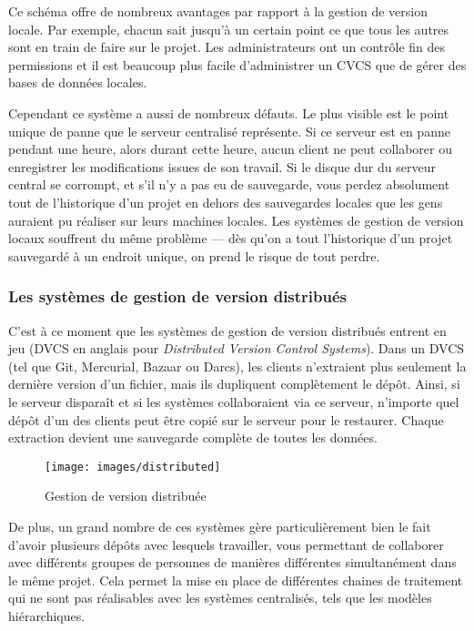 Ce schéma offre de nombreux avantages par rapport à la gestion de version locale.
Par exemple, chacun sait jusqu'à un certain point ce que tous les autres sont en train de faire sur le projet.
Les administrateurs ont un contrôle fin des permissions et il est beaucoup plus facile d'administrer un CVCS que de gérer des bases de données locales.

Cependant ce système a aussi de nombreux défauts.
Le plus visible est le point unique de panne que le serveur centralisé représente.
Si ce serveur est en panne pendant une heure, alors durant cette heure, aucun client ne peut collaborer ou enregistrer les modifications issues de son travail.
Si le disque dur du serveur central se corrompt, et s'il n'y a pas eu de sauvegarde, vous perdez absolument tout de l'historique d'un projet en dehors des sauvegardes locales que les gens auraient pu réaliser sur leurs machines locales.
Les systèmes de gestion de version locaux souffrent du même problème  --- dès qu'on a tout l'historique d'un projet sauvegardé à un endroit unique, on prend le risque de tout perdre.

\subsubsection{Les systèmes de gestion de version distribués}

C'est à ce moment que les systèmes de gestion de version distribués entrent en jeu (DVCS en anglais pour \emph{Distributed Version Control Systems}).
Dans un DVCS (tel que Git, Mercurial, Bazaar ou Darcs), les clients n'extraient plus seulement la dernière version d'un fichier, mais ils dupliquent complètement le dépôt.
Ainsi, si le serveur disparaît et si les systèmes collaboraient via ce serveur, n'importe quel dépôt d'un des clients peut être copié sur le serveur pour le restaurer.
Chaque extraction devient une sauvegarde complète de toutes les données.

\begin{figure}[H]
  \centering
  \texttt{[image: images/distributed]}
  \caption{Gestion de version distribuée}
  \label{fig:git:distributed}
\end{figure}

De plus, un grand nombre de ces systèmes gère particulièrement bien le fait d'avoir plusieurs dépôts avec lesquels travailler, vous permettant de collaborer avec différents groupes de personnes de manières différentes simultanément dans le même projet.
Cela permet la mise en place de différentes chaines de traitement qui ne sont pas réalisables avec les systèmes centralisés, tels que les modèles hiérarchiques.

